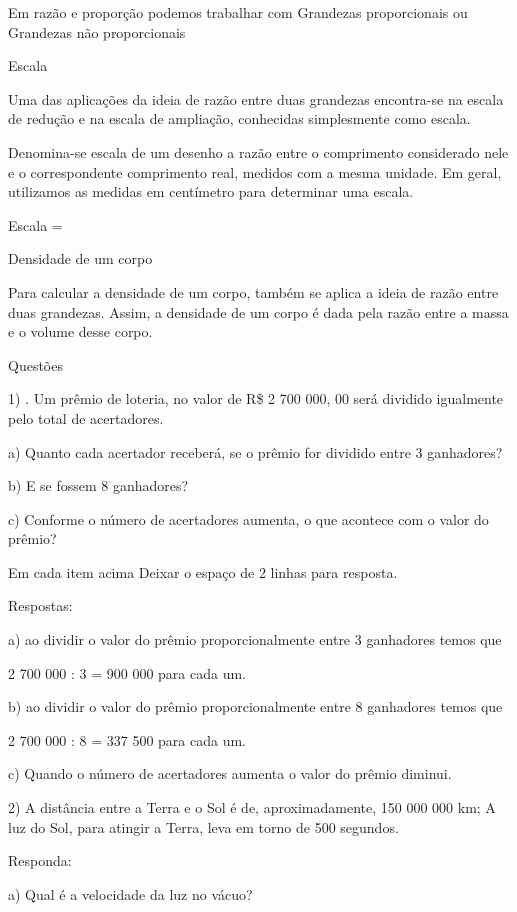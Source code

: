 Em razão e proporção podemos trabalhar com Grandezas proporcionais ou
Grandezas não proporcionais

Escala

Uma das aplicações da ideia de razão entre duas grandezas encontra-se na
escala de redução e na escala de ampliação, conhecidas simplesmente como
escala.

Denomina-se escala de um desenho a razão entre o comprimento considerado
nele e o correspondente comprimento real, medidos com a mesma unidade.
Em geral, utilizamos as medidas em centímetro para determinar uma
escala.

Escala =

Densidade de um corpo

Para calcular a densidade de um corpo, também se aplica a ideia de razão
entre duas grandezas. Assim, a densidade de um corpo é dada pela razão
entre a massa e o volume desse corpo.


Questões

1) . Um prêmio de loteria, no valor de R\$ 2 700 000, 00 será dividido
igualmente pelo total de acertadores.

a) Quanto cada acertador receberá, se o prêmio for dividido entre 3
ganhadores?

b) E se fossem 8 ganhadores?

c) Conforme o número de acertadores aumenta, o que acontece com o valor
do prêmio?

Em cada item acima Deixar o espaço de 2 linhas para resposta.

Respostas:

a) ao dividir o valor do prêmio proporcionalmente entre 3 ganhadores
temos que

2 700 000 : 3 = 900 000 para cada um.

b) ao dividir o valor do prêmio proporcionalmente entre 8 ganhadores
temos que

2 700 000 : 8 = 337 500 para cada um.

c) Quando o número de acertadores aumenta o valor do prêmio diminui.

2) A distância entre a Terra e o Sol é de, aproximadamente, 150 000 000
km; A luz do Sol, para atingir a Terra, leva em torno de 500 segundos.

Responda:

a) Qual é a velocidade da luz no vácuo?

